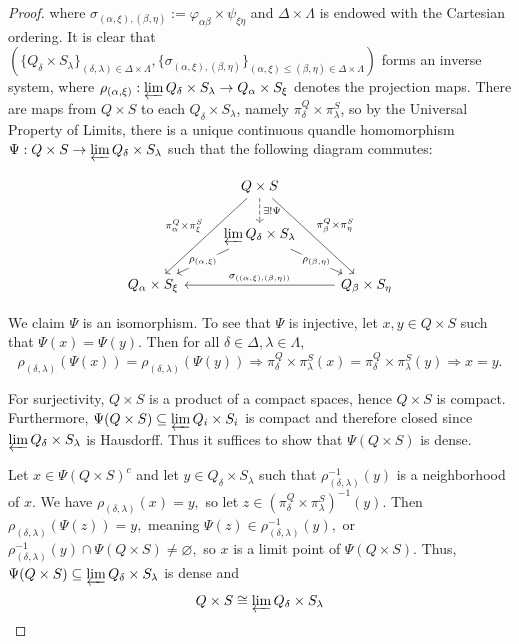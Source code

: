 \documentclass[reqno,dvipsnames]{amsart}
\renewcommand{\a}{\alpha}
\renewcommand{\b}{\beta}
\theoremstyle{definition}
\begin{document}
{\begin{proof}
where $\sigma_{(\alpha,\xi),(\beta,\eta)} := \varphi_{\a\b} \times \psi_{\xi\eta}$ and $\Delta \times \Lambda$ is endowed with the Cartesian ordering. It is clear that $(\{Q_\delta \times S_\lambda\}_{(\delta,\lambda) \in \Delta \times \Lambda}, \{\sigma_{(\alpha,\xi),(\beta,\eta)}\}_{(\alpha,\xi)\leq (\beta,\eta) \in \Delta \times \Lambda})$ forms an inverse system, where $\rho_{(\a,\xi)} : \varprojlim Q_\delta \times S_\lambda \to Q_\a \times S_\xi$ denotes the projection maps. There are maps from $Q \times S$ to each $Q_\delta \times S_\lambda$, namely $\pi_\delta^Q \times \pi_\lambda^S$, so by the Universal Property of Limits, there is a unique continuous quandle homomorphism $\Psi : Q \times S \to \varprojlim Q_\delta \times S_\lambda$ such that the following diagram commutes:

\[\begin{tikzcd}
	& {Q \times S} \\
	& {\varprojlim Q_\delta \times S_\lambda} \\
	{Q_\a \times S_\xi} && {Q_\b \times S_\eta}
	\arrow["{\rho_{(\b,\eta)}}"{description}, from=2-2, to=3-3]
	\arrow["{\rho_{(\a,\xi)}}"{description}, from=2-2, to=3-1]
    \arrow["{\sigma_{((\a,\xi),(\b,\eta))}}"', from=3-3, to=3-1]	
    \arrow["{\pi^Q_\b \times \pi^S_\eta}", from=1-2, to=3-3]
	\arrow["{\pi^Q_\a \times \pi^S_\xi}"', from=1-2, to=3-1]
	\arrow["{\exists!\Psi}", dashed, from=1-2, to=2-2]
\end{tikzcd}\]

We claim $\Psi$ is an isomorphism. To see that $\Psi$ is injective, let $x,y \in Q \times S$ such that $\Psi(x) = \Psi(y).$ Then for all $\delta \in\Delta, \lambda \in \Lambda,$
\[\rho_{(\delta,\lambda)}(\Psi(x)) = \rho_{(\delta,\lambda)}(\Psi(y)) \Rightarrow \pi^Q_\delta\times\pi^S_\lambda(x) = \pi^Q_\delta\times\pi^S_\lambda(y) \Rightarrow x = y.\]

For surjectivity, $Q \times S$ is a product of a compact spaces, hence $Q \times S$ is compact. Furthermore, $\Psi(Q \times S) \subseteq \varprojlim Q_i \times S_i$ is compact and therefore closed since $\varprojlim Q_\delta \times S_\lambda$ is Hausdorff. Thus it suffices to show that $\Psi(Q \times S)$ is dense.

Let $x \in \Psi(Q \times S)^c$ and let $y \in Q_\delta \times S_\lambda$ such that $\rho_{(\delta,\lambda)}^{-1}(y)$ is a neighborhood of $x$. We have $\rho_{(\delta,\lambda)}(x) = y,$ so let $z \in (\pi^Q_\delta \times \pi^S_\lambda)^{-1}(y).$ Then $\rho_{(\delta,\lambda)}(\Psi(z)) = y,$ meaning $\Psi(z) \in \rho_{(\delta,\lambda)}^{-1}(y),$ or $\rho_{(\delta,\lambda)}^{-1}(y) \cap \Psi(Q \times S) \neq \varnothing,$ so $x$ is a limit point of $\Psi(Q \times S)$. Thus, $\Psi(Q \times S) \subseteq \varprojlim Q_\delta \times S_\lambda$ is dense and 
\[Q \times S \cong \varprojlim Q_\delta \times S_\lambda\] 
\end{proof}

}
\end{document}
